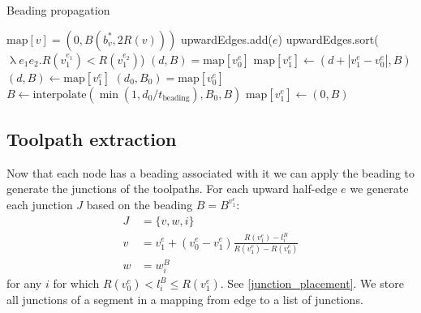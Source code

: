 \begin{algorithm}
\caption{Beading propagation}
\label{alg_beading_propagation}
\begin{algorithmic}
	 $\text{map}[v] = (0, B(b^*_v, 2 R(v)))$ \EndIf
\EndFor
{}
		upwardEdges.add($e$)
	\EndIf
\EndFor
\State upwardEdges.sort($\uplambda e_1 e_2 . R(v_1^{e_1}) < R(v_1^{e_2})$) 
 
    		\State $(d, B) = \text{map}[v_0^e]$
    		\State $\text{map}[v_1^e] \leftarrow (d + |v_1^e - v_0^e|, B)$
	\EndIf
\EndFor
{} 
    		\State $(d, B) \leftarrow \text{map}[v_1^e]$
    			\State $(d_0, B_0) = \text{map}[v_0^e]$
    			\State $B \leftarrow \text{interpolate}(\min(1, d_0 /  t_\text{beading}), B_0, B)$
    		\EndIf
    		\State $\text{map}[v_1^e] \leftarrow (0, B)$
	\EndIf
\EndFor
\end{algorithmic}
\end{algorithm}
















\subsection{Toolpath extraction}\label{sec_toolpath_extraction}
Now that each node has a beading associated with it we can apply the beading to generate the junctions of the toolpaths.
For each upward half-edge $e$ we generate each junction $J$ based on the beading $B = B^{v_1^e}$:
\begin{align*}
J &= \{ v, w, i \} \\ 
v &= v_1^e + (v_0^e - v_1^e) \frac{R(v_1^e) - l_i^B}{R(v_1^e) - R(v_0^e)} \\ 
w &= w_i^B
\end{align*}
for any $i$ for which $R(v_0^e) < l_i^B \leq R(v_1^e)$.
See \cref{junction_placement}.
We store all junctions of a segment in a mapping from edge to a list of junctions.


